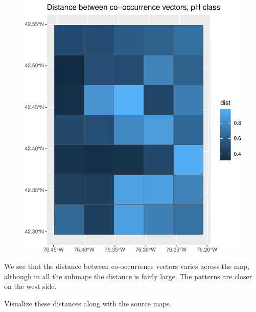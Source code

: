 \documentclass[
  letterpaper,
  DIV=11,
  numbers=noendperiod]{scrartcl}
\begin{document}
\begin{figure}[H]

{\centering \includegraphics{PatternAnalysisWorkshopTutorial_files/figure-pdf/lsp.compare.window-1.pdf}

}

\end{figure}

We see that the distance between co-occurrence vectors varies across the
map, although in all the submaps the distance is fairly large. The
patterns are closer on the west side.

Visualize these distances along with the source maps.
\end{document}

